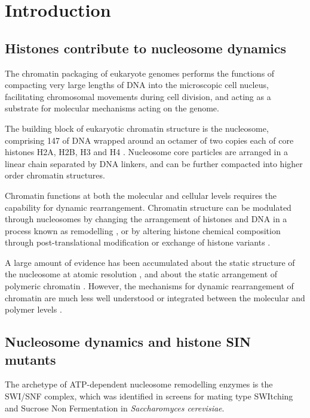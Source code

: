 \section{Introduction}

  \subsection{Histones contribute to nucleosome dynamics}

    The chromatin packaging of eukaryote genomes performs the
    functions of compacting very large lengths of DNA into the
    microscopic cell nucleus, facilitating chromosomal movements
    during cell division, and acting as a substrate for molecular
    mechanisms acting on the genome.

    The building block of eukaryotic chromatin structure is the
    nucleosome, comprising \SI{147}{\bp} of DNA wrapped around an
    octamer of two copies each of core histones H2A, H2B, H3 and H4
    \citep{luger1997crystal}.  Nucleosome core particles are arranged
    in a linear chain separated by DNA linkers, and can be further
    compacted into higher order chromatin structures.

    Chromatin functions at both the molecular and cellular levels
    requires the capability for dynamic rearrangement.  Chromatin
    structure can be modulated through nucleosomes by changing the
    arrangement of histones and DNA in a process known as remodelling
    , or by altering histone chemical composition through
    post-translational modification  or exchange of histone
    variants .

    A large amount of evidence has been accumulated about the static
    structure of the nucleosome at atomic resolution , and
    about the static arrangement of polymeric chromatin .
    However, the mechanisms for dynamic rearrangement of chromatin are
    much less well understood or integrated between the molecular and
    polymer levels .

  \subsection{Nucleosome dynamics and histone SIN mutants}

    The archetype of ATP-dependent nucleosome remodelling enzymes is
    the SWI/SNF complex, which was identified in screens for mating
    type SWItching \citep{SWI-mutants} and Sucrose Non Fermentation
    \citep{SNF-mutants-original-discovery, SNF-mutants2} in
    \textit{Saccharomyces cerevisiae}.

